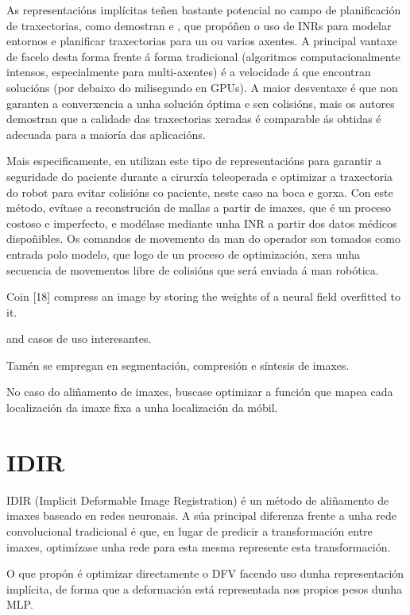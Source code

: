 As representacións implícitas teñen bastante potencial no campo de planificación de traxectorias, como demostran \cite{yu2024neuraltrajectorymodelimplicit} e \cite{trajectinr}, 
que propóñen o uso de INRs para modelar entornos e planificar traxectorias para un ou varios axentes.
A principal vantaxe de facelo desta forma frente á forma tradicional (algoritmos computacionalmente intensos, especialmente para multi-axentes) é a velocidade á que encontran solucións (por debaixo do milisegundo en GPUs).
A maior desventaxe é que non garanten a converxencia a unha solución óptima e sen colisións, mais os autores demostran que a calidade das traxectorias xeradas é comparable ás obtidas é adecuada para a maioría das aplicacións.

Mais especificamente, en \cite{teleoperatdrob} utilizan este tipo de representacións para garantir a seguridade do paciente durante a cirurxía teleoperada e optimizar a traxectoria do robot para evitar colisións co paciente, neste caso na boca e gorxa.
Con este método, evítase a reconstrución de mallas a partir de imaxes, que é un proceso costoso e imperfecto, e modélase mediante unha INR a partir dos datos médicos dispoñibles.
Os comandos de movemento da man do operador son tomados como entrada polo modelo, que logo de un proceso de optimización, xera unha secuencia de movementos libre de colisións que será enviada á man robótica.

Coin [18] compress an image by storing the
weights of a neural field overfitted to it.

\cite{velikova2024implicitneuralrepresentationsbreathingcompensated} and  casos de uso interesantes.

Tamén se empregan en segmentación, compresión e síntesis de imaxes.

 No caso do aliñamento de imaxes, buscase optimizar a función que mapea cada localización da imaxe fixa a unha localización da móbil.
 

\section{IDIR}
\label{sec:IDIR}
IDIR (Implicit Deformable Image Registration) é un método de aliñamento de imaxes baseado en redes neuronais. 
A súa principal diferenza frente a unha rede convolucional tradicional é que, 
en lugar de predicir a transformación entre imaxes, optimízase unha rede para esta mesma represente esta transformación.

O que \cite{wolterink2021implicit} propón é optimizar directamente o DFV facendo uso
 dunha representación implícita, de forma que a deformación está representada nos propios pesos dunha MLP.

